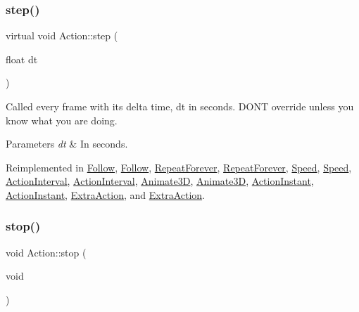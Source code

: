 \mbox{\label{classAction_a86cd2041b439b7ca7bc59ce7d6e0aa12}} 
\subsubsection{\texorpdfstring{step()}{step()}\hspace{0.1cm}{\footnotesize\ttfamily [2/2]}}
{\footnotesize\ttfamily virtual void Action\+::step (\begin{DoxyParamCaption}\item[{float}]{dt }\end{DoxyParamCaption})\hspace{0.3cm}{\ttfamily [virtual]}}

Called every frame with it\textquotesingle{}s delta time, dt in seconds. D\+ON\textquotesingle{}T override unless you know what you are doing.


\begin{DoxyParams}{Parameters}
{\em dt} & In seconds. \\
\hline
\end{DoxyParams}


Reimplemented in \hyperlink{classFollow_a808fb0fab228b588de9642dc40bf9a14}{Follow}, \hyperlink{classFollow_a0f027ac080c352070a653d1dbb8f761d}{Follow}, \hyperlink{classRepeatForever_a102815f01bc0afc0fbcb31840cdb699b}{Repeat\+Forever}, \hyperlink{classRepeatForever_ab54150411685995a17a2b68d561e8d9c}{Repeat\+Forever}, \hyperlink{classSpeed_affaf70de829e3452df106ec55a238807}{Speed}, \hyperlink{classSpeed_a971cac28a44053f2011871529dac49a1}{Speed}, \hyperlink{classActionInterval_af31c89d43ca311f700b66f6b4fa1f362}{Action\+Interval}, \hyperlink{classActionInterval_a9a520f0c4bd2d5b92e7f355bccd6f5cf}{Action\+Interval}, \hyperlink{classAnimate3D_a9fed05e5478085f002769b6931a123d4}{Animate3D}, \hyperlink{classAnimate3D_a0bd0e3f67af5be334ef07255a711c476}{Animate3D}, \hyperlink{classActionInstant_ae1478ff1e34788247a0092dbd431c825}{Action\+Instant}, \hyperlink{classActionInstant_ab6c8b1bb612803681a2727a1d5d7b5df}{Action\+Instant}, \hyperlink{classExtraAction_adf523dd380d7c8e093c58473e2c84304}{Extra\+Action}, and \hyperlink{classExtraAction_a7e15c6b27f49d1057bf81bd0527f041b}{Extra\+Action}.

\mbox{\label{classAction_a968267fa7a1dcc46a2976249a712d3c8}} 
\subsubsection{\texorpdfstring{stop()}{stop()}\hspace{0.1cm}{\footnotesize\ttfamily [1/2]}}
{\footnotesize\ttfamily void Action\+::stop (\begin{DoxyParamCaption}\item[{void}]{ }\end{DoxyParamCaption})\hspace{0.3cm}{\ttfamily [virtual]}}

